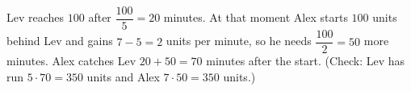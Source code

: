 Lev reaches $100$ after $\dfrac{100}{5}=20$ minutes. At that moment Alex starts $100$ units behind Lev and gains $7-5=2$ units per minute, so he needs $\dfrac{100}{2}=50$ more minutes. Alex catches Lev $20+50=\boxed{70}$ minutes after the start. (Check: Lev has run $5\cdot70=350$ units and Alex $7\cdot50=350$ units.)
